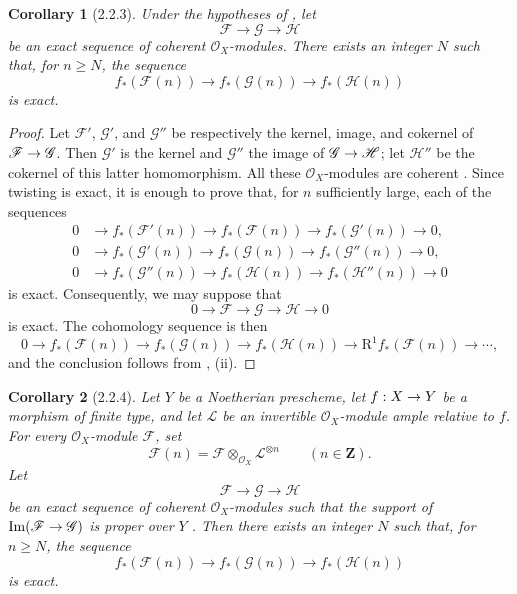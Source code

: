 \documentclass[oneside]{amsart}
\theoremstyle{ega-env-style}
\theoremstyle{ega-thm-env-style}
\newtheorem*{corollary}{Corollary}
\theoremstyle{ega-defn-env-style}
\def\mathcal{\mathscr}
\def\sh{\mathcal}                   %
\def\bb{\mathbf}                    %
\def\geq{\geqslant}                 %
\def\RR{\mathrm{R}}                 %
\renewcommand{\to}{\mathchoice{\longrightarrow}{\rightarrow}{\rightarrow}{\rightarrow}}
\newcommand{\oldpage}[2][]{{\marginnote{\normalfont{\textbf{#1}~|~#2}}}\ignorespaces}
\let\EGAOriginalLabel\label
\renewcommand{\label}[1]{\phantomsection\EGAOriginalLabel{#1}}
\begin{document}
\begin{corollary}[2.2.3]
\label{III.2.2.3}
Under the hypotheses of , let
\[
  \sh{F}\longrightarrow\sh{G}\longrightarrow\sh{H}
\]
be an exact sequence of coherent $\sh{O}_X$-modules.
There exists an integer $N$ such that, for $n\geq N$, the sequence
\[
  f_*(\sh{F}(n))
  \longrightarrow f_*(\sh{G}(n))
  \longrightarrow f_*(\sh{H}(n))
\]
is exact.
\end{corollary}

\begin{proof}
Let $\sh{F}'$, $\sh{G}'$, and $\sh{G}''$ be respectively the kernel, image, and cokernel of $\sh{F}\to\sh{G}$.
Then $\sh{G}'$ is the kernel and $\sh{G}''$ the image of $\sh{G}\to\sh{H}$; let $\sh{H}''$ be the cokernel of this latter homomorphism.
All these $\sh{O}_X$-modules are coherent .
Since twisting is exact, it is enough to prove that, for $n$ sufficiently large, each of the sequences
\begin{align*}
  0&\longrightarrow f_*(\sh{F}'(n))
    \longrightarrow f_*(\sh{F}(n))
    \longrightarrow f_*(\sh{G}'(n))
    \longrightarrow0,\\
  0&\longrightarrow f_*(\sh{G}'(n))
    \longrightarrow f_*(\sh{G}(n))
    \longrightarrow f_*(\sh{G}''(n))
    \longrightarrow0,\\
  0&\longrightarrow f_*(\sh{G}''(n))
    \longrightarrow f_*(\sh{H}(n))
    \longrightarrow f_*(\sh{H}''(n))
    \longrightarrow0
\end{align*}
is exact.
Consequently, we may suppose that
\[
  0\longrightarrow\sh{F}\longrightarrow\sh{G}
   \longrightarrow\sh{H}\longrightarrow0
\]
is exact.
The cohomology sequence is then
\[
  0\longrightarrow f_*(\sh{F}(n))
  \longrightarrow f_*(\sh{G}(n))
  \longrightarrow f_*(\sh{H}(n))
  \longrightarrow \RR^1f_*(\sh{F}(n))
  \longrightarrow\cdots,
\]
and the conclusion follows from , (ii).
\end{proof}

\oldpage[III]{102}

\begin{corollary}[2.2.4]
\label{III.2.2.4}
Let $Y$ be a Noetherian prescheme, let $f:X\to Y$ be a morphism of finite type, and let $\sh{L}$ be an invertible $\sh{O}_X$-module ample relative to $f$.
For every $\sh{O}_X$-module $\sh{F}$, set
\[
  \sh{F}(n)=\sh{F}\otimes_{\sh{O}_X}\sh{L}^{\otimes n}
  \qquad(n\in\bb{Z}).
\]
Let
\[
  \sh{F}\longrightarrow\sh{G}\longrightarrow\sh{H}
\]
be an exact sequence of coherent $\sh{O}_X$-modules such that the support of $\operatorname{Im}(\sh{F}\to\sh{G})$ is proper over $Y$ .
Then there exists an integer $N$ such that, for $n\geq N$, the sequence
\[
  f_*(\sh{F}(n))
  \longrightarrow f_*(\sh{G}(n))
  \longrightarrow f_*(\sh{H}(n))
\]
is exact.
\end{corollary}
\end{document}
